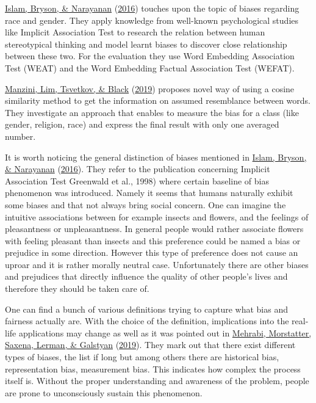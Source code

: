 \documentclass[12pt,]{book}
\begin{document}
\protect\hyperlink{ref-Caliskan2017Semantics}{Islam, Bryson, \& Narayanan} (\protect\hyperlink{ref-Caliskan2017Semantics}{2016}) touches upon the topic of biases regarding race and gender. They apply knowledge from well-known psychological studies like Implicit Association Test to research the relation between human stereotypical thinking and model learnt biases to
discover close relationship between these two. For the evaluation they use Word Embedding Association Test (WEAT) and the Word Embedding Factual Association Test (WEFAT).

\protect\hyperlink{ref-manzini2019black}{Manzini, Lim, Tsvetkov, \& Black} (\protect\hyperlink{ref-manzini2019black}{2019}) proposes novel way of using a cosine similarity method to get the information on assumed resemblance between words. They investigate
an approach that enables to measure the bias for a class (like gender, religion, race) and express the final result with only one averaged number.

It is worth noticing the general distinction of biases mentioned in \protect\hyperlink{ref-Caliskan2017Semantics}{Islam, Bryson, \& Narayanan} (\protect\hyperlink{ref-Caliskan2017Semantics}{2016}). They refer to the publication concerning Implicit Association
Test Greenwald et al., 1998) where certain baseline of bias phenomenon was introduced. Namely it seems that humans naturally exhibit some biases and
that not always bring social concern. One can imagine the intuitive associations between for example insects and flowers, and the feelings of pleasantness or unpleasantness. In general people would rather associate flowers with feeling pleasant than insects and this preference could be named a bias or
prejudice in some direction. However this type of preference does not cause an uproar and it is rather morally neutral case. Unfortunately there are other
biases and prejudices that directly influence the quality of other people's lives and therefore they should be taken care of.

One can find a bunch of various definitions trying to capture what bias and fairness actually are. With the choice of the definition, implications into the real-life applications may change as well as it was pointed out in \protect\hyperlink{ref-Mehrabi2019Survey}{Mehrabi, Morstatter, Saxena, Lerman, \& Galstyan} (\protect\hyperlink{ref-Mehrabi2019Survey}{2019}). They mark out that there exist different types of biases, the list if long but among others there are historical bias, representation bias, measurement bias. This indicates how complex the process itself is. Without the proper understanding and awareness of the problem, people are prone to unconsciously sustain this phenomenon.
\end{document}
